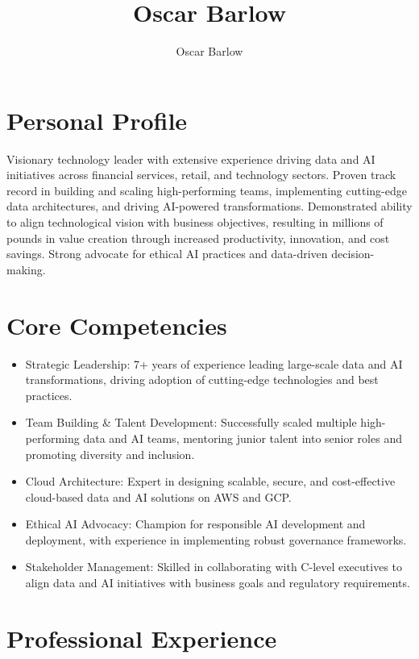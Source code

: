 \documentclass[a4paper]{scrartcl}
\author{Oscar Barlow}
\title{Oscar Barlow}
\date{}
\begin{document}
\maketitle

\section*{Personal Profile}
 { %
  \setlength{\parskip}{6pt plus 2pt minus 1pt}
  Visionary technology leader with extensive experience driving data and AI initiatives across financial services, retail, and technology sectors. Proven track record in building and scaling high-performing teams, implementing cutting-edge data architectures, and driving AI-powered transformations. Demonstrated ability to align technological vision with business objectives, resulting in millions of pounds in value creation through increased productivity, innovation, and cost savings. Strong advocate for ethical AI practices and data-driven decision-making.
 } %

\section*{Core Competencies}
\begin{itemize}
	\item Strategic Leadership: 7+ years of experience leading large-scale data and AI transformations, driving adoption of cutting-edge technologies and best practices.
	\item Team Building & Talent Development: Successfully scaled multiple high-performing data and AI teams, mentoring junior talent into senior roles and promoting diversity and inclusion.
	\item Cloud Architecture: Expert in designing scalable, secure, and cost-effective cloud-based data and AI solutions on AWS and GCP.
	\item Ethical AI Advocacy: Champion for responsible AI development and deployment, with experience in implementing robust governance frameworks.
	\item Stakeholder Management: Skilled in collaborating with C-level executives to align data and AI initiatives with business goals and regulatory requirements.
\end{itemize}

\section*{Professional Experience}
\end{document}
